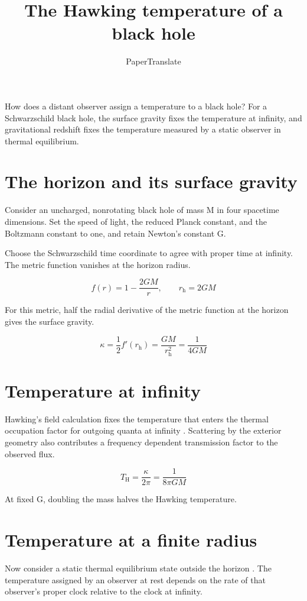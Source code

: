 \documentclass[11pt]{article}
\title{The Hawking temperature of a black hole}
\author{PaperTranslate}
\date{}
\begin{document}
\maketitle
How does a distant observer assign a temperature to a black hole? For a Schwarzschild black hole, the surface gravity fixes the temperature at infinity, and gravitational redshift fixes the temperature measured by a static observer in thermal equilibrium.

\section{The horizon and its surface gravity}
Consider an uncharged, nonrotating black hole of mass M in four spacetime dimensions. Set the speed of light, the reduced Planck constant, and the Boltzmann constant to one, and retain Newton’s constant G.

Choose the Schwarzschild time coordinate to agree with proper time at infinity. The metric function vanishes at the horizon radius.

\begin{equation}
f(r)=1-\frac{2GM}{r},\qquad r_{\mathrm{h}}=2GM\label{eq:metric}
\end{equation}

For this metric, half the radial derivative of the metric function at the horizon gives the surface gravity.

\begin{equation}
\kappa=\frac{1}{2}f'(r_{\mathrm{h}})=\frac{GM}{r_{\mathrm{h}}^{2}}=\frac{1}{4GM}\label{eq:kappa}
\end{equation}

\section{Temperature at infinity}
Hawking’s field calculation fixes the temperature that enters the thermal occupation factor for outgoing quanta at infinity \cite{hawking1975}. Scattering by the exterior geometry also contributes a frequency dependent transmission factor to the observed flux.

\begin{equation}
T_{\mathrm{H}}=\frac{\kappa}{2\pi}=\frac{1}{8\pi GM}\label{eq:temperature}
\end{equation}

At fixed G, doubling the mass halves the Hawking temperature.

\section{Temperature at a finite radius}
Now consider a static thermal equilibrium state outside the horizon \cite{tolman1930}. The temperature assigned by an observer at rest depends on the rate of that observer’s proper clock relative to the clock at infinity.
\end{document}
